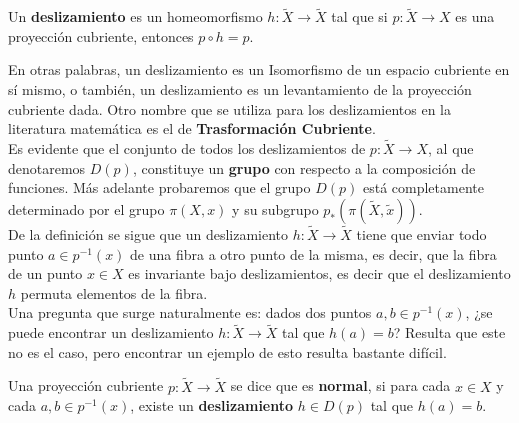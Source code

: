\begin{definition}

Un \textbf{deslizamiento} es un homeomorfismo $h:\widetilde{X} \rightarrow \widetilde{X}$ tal que si $p:\widetilde{X} \rightarrow X$ es una proyecci\'on cubriente, entonces $p \circ h= p$.\\

\end{definition}

En otras palabras, un deslizamiento es un Isomorfismo de un espacio cubriente en s\'i mismo, o tambi\'en, un deslizamiento es un levantamiento de la proyecci\'on cubriente dada. Otro nombre que se utiliza para los deslizamientos en la literatura matem\'atica es el de \textbf{Trasformaci\'on Cubriente}.\\

Es evidente que el conjunto de todos los deslizamientos de $p:\widetilde{X} \rightarrow X$, al que denotaremos $D(p)$, constituye un \textbf{grupo} con respecto a la composici\'on de funciones. M\'as adelante probaremos que el grupo $D(p)$ est\'a completamente determinado por el grupo $\pi(X,x)$ y su subgrupo $p_*(\pi (\widetilde{X},\widetilde{x}))$.\\

De la definici\'on se sigue que un deslizamiento $h: \widetilde{X} \rightarrow \widetilde{X}$ tiene que enviar todo punto $a \in p^{-1}(x)$ de una fibra a otro punto de la misma, es decir, que la fibra de un punto $x \in X$ es invariante bajo deslizamientos, es decir que el deslizamiento $h$ permuta elementos de la fibra.\\

Una pregunta que surge naturalmente es: dados dos puntos $a,b \in p^{-1}(x)$, ¿se puede encontrar un deslizamiento $h:\widetilde{X} \rightarrow \widetilde{X}$ tal que $h(a)=b$? Resulta que este no es el caso, pero encontrar un ejemplo de esto resulta bastante dif\'icil.

\begin{definition}

Una proyecci\'on cubriente $p:\widetilde{X} \rightarrow \widetilde{X}$ se dice que es \textbf{normal}, si para cada $x \in X$ y cada $a,b \in p^{-1}(x)$, existe un \textbf{deslizamiento} $h \in D(p)$ tal que $h(a)=b$.\\

\end{definition}  

